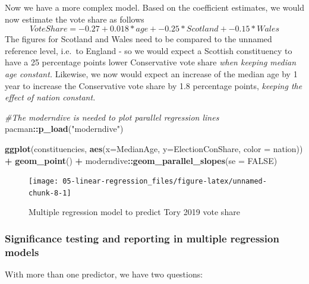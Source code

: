 \documentclass[
]{book}
\newenvironment{Shaded}{\begin{snugshade}}{\end{snugshade}}
\newcommand{\CommentTok}[1]{\textcolor[rgb]{0.56,0.35,0.01}{\textit{#1}}}
\newcommand{\DataTypeTok}[1]{\textcolor[rgb]{0.13,0.29,0.53}{#1}}
\newcommand{\KeywordTok}[1]{\textcolor[rgb]{0.13,0.29,0.53}{\textbf{#1}}}
\newcommand{\NormalTok}[1]{#1}
\newcommand{\OperatorTok}[1]{\textcolor[rgb]{0.81,0.36,0.00}{\textbf{#1}}}
\newcommand{\OtherTok}[1]{\textcolor[rgb]{0.56,0.35,0.01}{#1}}
\newcommand{\StringTok}[1]{\textcolor[rgb]{0.31,0.60,0.02}{#1}}
\begin{document}
Now we have a more complex model. Based on the coefficient estimates, we
would now estimate the vote share as follows
\[VoteShare=-0.27 +  0.018*age + -0.25*Scotland + -0.15*Wales\] The
figures for Scotland and Wales need to be compared to the unnamed
reference level, i.e.~to England - so we would expect a Scottish
constituency to have a 25 percentage points lower Conservative vote
share \emph{when keeping median age constant.} Likewise, we now would expect
an increase of the median age by 1 year to increase the Conservative
vote share by 1.8 percentage points, \emph{keeping the effect of nation
constant.}

\begin{Shaded}
\begin{Highlighting}[]
\CommentTok{#The moderndive is needed to plot parallel regression lines}
\NormalTok{pacman}\OperatorTok{::}\KeywordTok{p_load}\NormalTok{(}\StringTok{"moderndive"}\NormalTok{)}

\KeywordTok{ggplot}\NormalTok{(constituencies, }\KeywordTok{aes}\NormalTok{(}\DataTypeTok{x=}\NormalTok{MedianAge, }\DataTypeTok{y=}\NormalTok{ElectionConShare, }\DataTypeTok{color =}\NormalTok{ nation)) }\OperatorTok{+}\StringTok{ }\KeywordTok{geom_point}\NormalTok{() }\OperatorTok{+}\StringTok{ }\NormalTok{moderndive}\OperatorTok{::}\KeywordTok{geom_parallel_slopes}\NormalTok{(}\DataTypeTok{se =} \OtherTok{FALSE}\NormalTok{)}
\end{Highlighting}
\end{Shaded}

\begin{figure}

{\centering \texttt{[image: 05-linear-regression\_files/figure-latex/unnamed-chunk-8-1]} 

}

\caption{Multiple regression model to predict Tory 2019 vote share}\label{fig:unnamed-chunk-8}
\end{figure}

\hypertarget{significance-testing-and-reporting-in-multiple-regression-models}{%
\subsubsection{Significance testing and reporting in multiple regression models}\label{significance-testing-and-reporting-in-multiple-regression-models}}

With more than one predictor, we have two questions:
\end{document}
